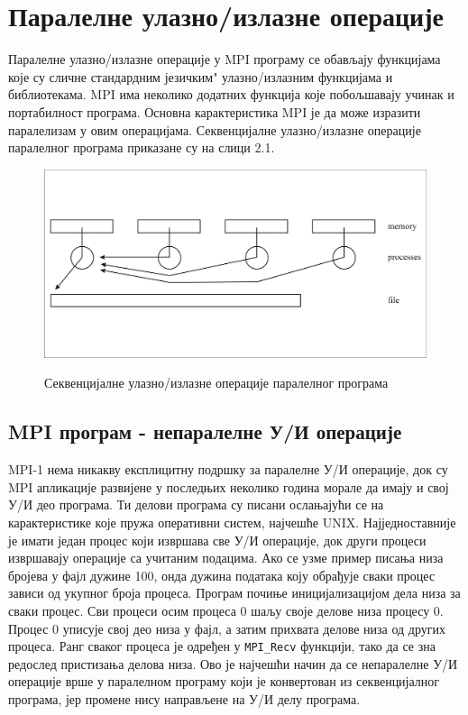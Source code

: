\section{Паралелне улазно/излазне операције}

Паралелне улазно/излазне операције у MPI програму се обављају функцијама које су сличне стандардним \zn језичким" улазно/излазним функцијама и библиотекама. MPI има неколико додатних функција које побољшавају  учинак и портабилност програма. Основна карактеристика MPI је да може изразити паралелизам у овим операцијама. Секвенцијалне улазно/излазне операције паралелног програма приказане су на слици 2.1.

\begin{figure}[h!]
  \centering
      \includegraphics[width=1\textwidth]{slike/sequential_i_o.png}\\[1cm]
  \caption{Секвенцијалне улазно/излазне операције паралелног програма}
\end{figure}

\subsection{MPI програм - непаралелне У/И операције}

MPI-1 нема никакву експлицитну подршку за паралелне У/И операције, док су MPI апликације развијене у последњих неколико година морале да имају и свој У/И део програма. Ти делови програма су писани ослањајући се на карактеристике које пружа оперативни систем, најчешће UNIX. Најједноставније је имати један процес који извршава све У/И операције, док други процеси извршавају операције са учитаним подацима. Ако се узме пример писања низа бројева у фајл дужине 100, онда дужина података коју обрађује сваки процес зависи од укупног броја процеса. Програм почиње иницијализацијом дела низа за сваки процес. Сви процеси осим процеса 0 шаљу своје делове низа процесу 0. Процес 0 уписује свој део низа у фајл, а затим прихвата делове низа од других процеса. Ранг сваког процеса је одређен у  \texttt{MPI\_Recv} функцији, тако да се зна редослед пристизања делова низа. Ово је најчешћи начин да се непаралелне У/И операције врше у паралелном програму који је конвертован из секвенцијалног програма, јер промене нису  направљене на У/И делу програма. 

